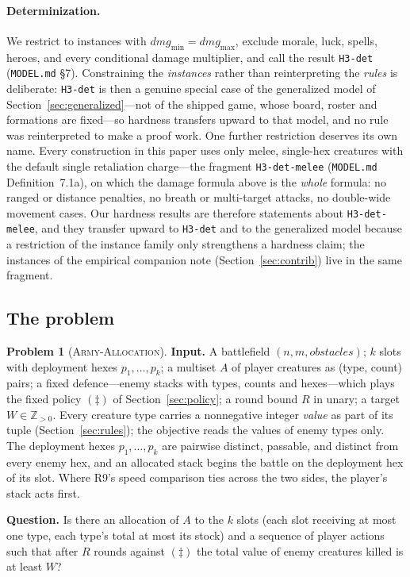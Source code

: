 \documentclass[11pt,a4paper]{article}
\theoremstyle{plain}
\theoremstyle{definition}
\theoremstyle{plain}
\theoremstyle{definition}
\newtheorem*{problem}{Problem}
\theoremstyle{remark}
\newcommand{\ALLOC}{\textsc{Army-Allocation}}
\newcommand{\src}[1]{\texttt{#1}}
\begin{document}
\paragraph{Determinization.} We restrict to instances with
$\mathit{dmg}_{\min}=\mathit{dmg}_{\max}$, exclude morale, luck, spells, heroes, and every
conditional damage multiplier, and call the result \texttt{H3-det} (\src{MODEL.md} \S7).
Constraining the \emph{instances} rather than reinterpreting the \emph{rules} is deliberate:
\texttt{H3-det} is then a genuine special case of the generalized model of
Section~\ref{sec:generalized}---not of the shipped game, whose board, roster and formations are
fixed---so hardness transfers upward to that model, and no rule was reinterpreted to make a
proof work.
One further restriction deserves its own name. Every construction in this paper uses only
melee, single-hex creatures with the default single retaliation charge---the fragment
\texttt{H3-det-melee} (\src{MODEL.md} Definition~7.1a), on which the damage formula above
is the \emph{whole} formula: no ranged or distance penalties, no breath or multi-target
attacks, no double-wide movement cases. Our hardness results are therefore statements about
\texttt{H3-det-melee}, and they transfer upward to \texttt{H3-det} and to the generalized
model because a restriction of the instance family only strengthens a hardness claim; the
instances of the empirical companion note (Section~\ref{sec:contrib}) live in the same fragment.

\subsection{The problem}\label{sec:problem}

\begin{problem}[\ALLOC]
\textbf{Input.} A battlefield $(n,m,\mathit{obstacles})$; $k$ slots with deployment hexes
$p_1,\dots,p_k$; a multiset $A$ of player creatures as (type, count) pairs; a fixed
defence---enemy stacks with types, counts and hexes---which plays the fixed policy
$(\ddagger)$ of Section~\ref{sec:policy}; a round bound $R$ in unary; a target
$W\in\mathbb{Z}_{>0}$. Every creature type carries a nonnegative integer \emph{value} as part
of its tuple (Section~\ref{sec:rules}); the objective reads the values of enemy types only.
The deployment hexes $p_1,\dots,p_k$ are pairwise distinct, passable, and distinct from every
enemy hex, and an allocated stack begins the battle on the deployment hex of its slot. Where
R9's speed comparison ties across the two sides, the player's stack acts first.

\noindent\textbf{Question.} Is there an allocation of $A$ to the $k$ slots (each slot receiving
at most one type, each type's total at most its stock) and a sequence of player actions such
that after $R$ rounds against $(\ddagger)$ the total value of enemy creatures killed is at
least $W$?
\end{problem}
\end{document}
